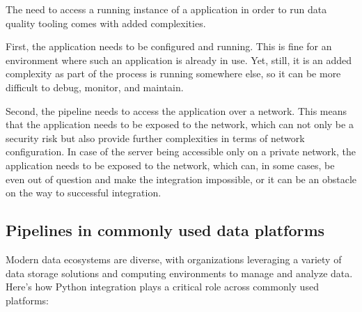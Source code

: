 The need to access a running instance of a  application in order to run data quality tooling comes with added complexities.

First, the application needs to be configured and running. This is fine for an environment where such an application is already in use. Yet, still, it is an added complexity as part of the process is running somewhere else, so it can be more difficult to debug, monitor, and maintain.

Second, the pipeline needs to access the application over a network. This means that the application needs to be exposed to the network, which can not only be a security risk but also provide further complexities in terms of network configuration. In case of the server being accessible only on a private network, the application needs to be exposed to the network, which can, in some cases, be even out of question and make the integration impossible, or it can be an obstacle on the way to successful integration.

\subsection{Pipelines in commonly used data platforms}

Modern data ecosystems are diverse, with organizations leveraging a variety of data storage solutions and computing environments to manage and analyze data. Here’s how Python integration plays a critical role across commonly used platforms:

